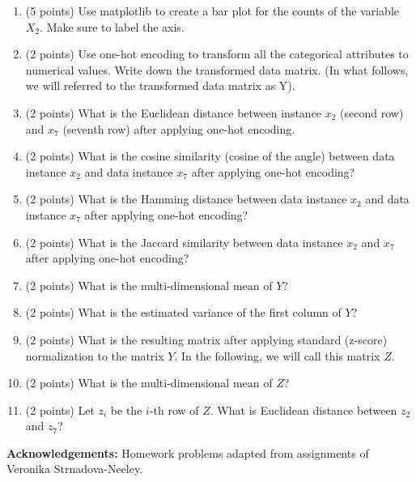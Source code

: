 \documentclass[11pt]{article}
\begin{document}
\begin{enumerate}
    \item (5 points) Use matplotlib to create a bar plot for the counts of the
    variable $X_2$.  Make sure to label the axis.

    \item (2 points) Use one-hot encoding to transform all the categorical
    attributes to numerical values.  Write down the transformed data matrix. (In
    what follows, we will referred to the transformed data matrix as Y).

    \item (2 points) What is the Euclidean distance between instance $x_2$
    (second row) and $x_7$ (seventh row) after applying one-hot encoding.

    \item (2 points) What is the cosine similarity (cosine of the angle)
    between data instance $x_2$ and data instance $x_7$ after applying one-hot
    encoding?

    \item (2 points) What is the Hamming distance between data instance $x_2$
    and data instance $x_7$ after applying one-hot encoding?

    \item (2 points) What is the Jaccard similarity between data instance $x_2$
    and $x_7$ after applying one-hot encoding?


    \item (2 points) What is the multi-dimensional mean of $Y$?


    \item (2 points) What is the estimated variance of the first column of $Y$?

    \item (2 points) What is the resulting matrix after applying standard
    (z-score) normalization to the matrix $Y$.  In the following, we will call
    this matrix $Z$.

    \item (2 points) What is the multi-dimensional mean of $Z$?

    \item (2 points) Let $z_i$ be the $i$-th row of $Z$.  What is Euclidean
    distance between $z_2$ and $z_7$?

\end{enumerate}

{\bf Acknowledgements:} Homework problems adapted from assignments of
Veronika Strnadova-Neeley.
\end{document}
